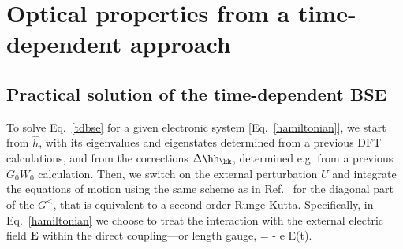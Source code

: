 \section{Optical properties from a time-dependent approach}
\label{teospectro}      
\subsection{Practical solution of the time-dependent BSE}
\label{ss:solution}
To solve Eq.~\eqref{tdbse} for a given electronic system [Eq.~\eqref{hamiltonian}], we start from $\hat{h}$, with its eigenvalues and eigenstates determined from a previous DFT calculations, and from the corrections $\Delta \hh_\kk$, determined e.g. from a previous $G_0W_0$ calculation.
Then, we switch on the external perturbation $U$ and integrate the
equations of motion using the same scheme as in Ref.~\cite{Kohler1999123} for the diagonal part of the $G^<$, that is equivalent to a second order Runge-Kutta. Specifically, in Eq.~\eqref{hamiltonian} we choose to treat the interaction with the external electric field $\mathbf E$ within the direct coupling---or length gauge,
\be
{} = - e \cdot \mathbf E(t). \label{eq:lengau}
\ee

